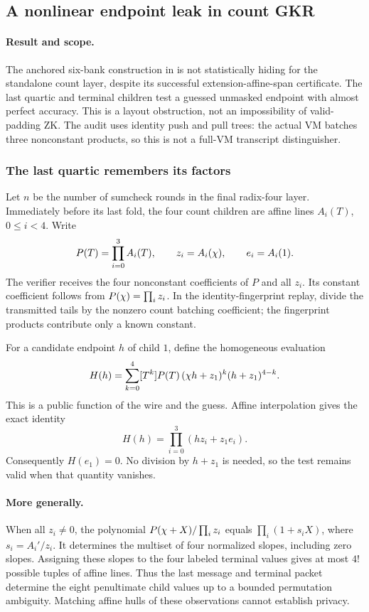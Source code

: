 \subsection{A nonlinear endpoint leak in count GKR}\label{note:zk-count-tail}

\paragraph{Result and scope.} The anchored six-bank construction in  is not statistically hiding for the standalone count layer, despite its successful extension-affine-span certificate. The last quartic and terminal children test a guessed unmasked endpoint with almost perfect accuracy. This is a layout obstruction, not an impossibility of valid-padding ZK. The audit uses identity push and pull trees: the actual VM batches three nonconstant products, so this is not a full-VM transcript distinguisher.

\subsubsection{The last quartic remembers its factors}

Let $n$ be the number of sumcheck rounds in the final radix-four layer. Immediately before its last fold, the four count children are affine lines $A_i(T)$, $0\le i<4$. Write
\[
 P(T)=\prod_{i=0}^3 A_i(T),\qquad
 z_i=A_i(\chi),\qquad e_i=A_i(1).
\]
The verifier receives the four nonconstant coefficients of $P$ and all $z_i$. Its constant coefficient follows from $P(\chi)=\prod_i z_i$. In the identity-fingerprint replay, divide the transmitted tails by the nonzero count batching coefficient; the fingerprint products contribute only a known constant.

For a candidate endpoint $h$ of child $1$, define the homogeneous evaluation
\[
 H(h)=\sum_{k=0}^4 [T^k]P(T)\,
 (\chi h+z_1)^k(h+z_1)^{4-k}.
\]
This is a public function of the wire and the guess. Affine interpolation gives the exact identity
\[
 H(h)=\prod_{i=0}^3(hz_i+z_1e_i).
\]
Consequently $H(e_1)=0$. No division by $h+z_1$ is needed, so the test remains valid when that quantity vanishes.

\paragraph{More generally.} When all $z_i\ne0$, the polynomial $P(\chi+X)/\prod_i z_i$ equals $\prod_i(1+s_iX)$, where $s_i=A_i'/z_i$. It determines the multiset of four normalized slopes, including zero slopes. Assigning these slopes to the four labeled terminal values gives at most $4!$ possible tuples of affine lines. Thus the last message and terminal packet determine the eight penultimate child values up to a bounded permutation ambiguity. Matching affine hulls of these observations cannot establish privacy.

